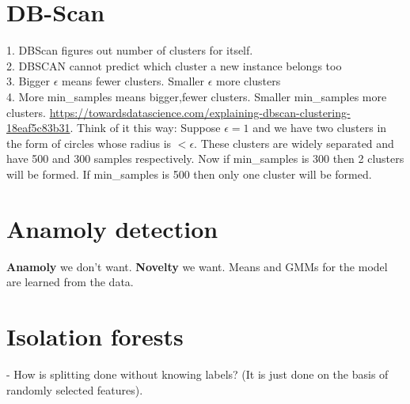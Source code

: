 \documentclass{article}
\begin{document}
\section{DB-Scan}
1. DBScan figures out number of clusters for itself.\\
2. DBSCAN cannot predict which cluster a new instance belongs too\\
3. Bigger $\epsilon$ means fewer clusters. Smaller $\epsilon$ more clusters\\
4. More min\_samples means bigger,fewer clusters. Smaller min\_samples more clusters. \url{https://towardsdatascience.com/explaining-dbscan-clustering-18eaf5c83b31}. Think of it this way: Suppose $\epsilon=1$ and we have two clusters in the form of circles whose radius is  $<\epsilon$. These clusters are widely separated and have 500 and 300 samples respectively. Now if min\_samples is 300 then 2 clusters will be formed. If min\_samples is 500 then only one cluster will be formed. \\

\section{Anamoly detection}
\textbf{Anamoly} we don't want. \textbf{Novelty} we want. Means and GMMs for the model are learned from the data.

\section{Isolation forests}
- How is splitting done without knowing labels? (It is just done on the basis of randomly selected features).
\end{document}
